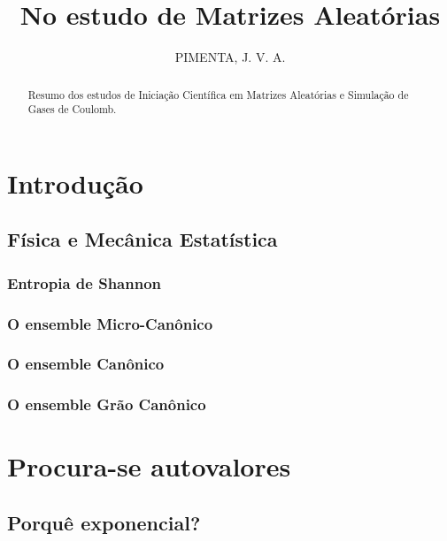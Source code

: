 \documentclass[11pt,oneside,a4paper]{report}
\title{
	{No estudo de Matrizes Aleatórias}\\
}
\author{PIMENTA, J. V. A.}
\begin{document}
\maketitle

\begin{abstract}
	Resumo dos estudos de Iniciação Científica em Matrizes Aleatórias e Simulação de Gases de Coulomb.
\end{abstract}

\tableofcontents

\chapter{Introdução}


\section{Física e Mecânica Estatística}


\subsection{Entropia de Shannon}


\subsection{O ensemble Micro-Canônico}


\subsection{O ensemble Canônico}


\subsection{O ensemble Grão Canônico}


\chapter{Procura-se autovalores}


\section{Porquê exponencial?}

\end{document}
